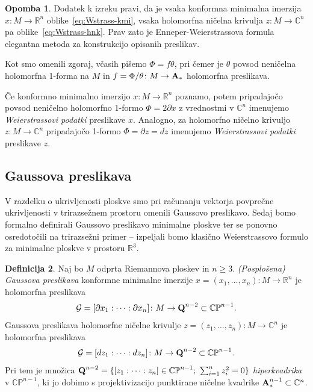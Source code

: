 \documentclass[12pt,a4paper,twoside]{article}
\theoremstyle{definition} %
\newtheorem{definicija}{Definicija}[section]
\newtheorem{opomba}[definicija]{Opomba}
\theoremstyle{plain} %
\numberwithin{equation}{section}  %
\newcommand{\R}{\mathbb R}
\newcommand{\C}{\mathbb C}
\begin{document}
\begin{opomba}
Dodatek k izreku pravi, da je vsaka konformna minimalna imerzija $x \colon M \to \R^{n}$ oblike~\eqref{eq:Wstrass-kmi}, vsaka holomorfna ničelna krivulja $z \colon M \to \C^{n}$ pa oblike~\eqref{eq:Wstrass-hnk}. Prav zato je Enneper-Weierstrassova formula elegantna metoda za konstrukcijo opisanih preslikav.

Kot smo omenili zgoraj, včasih pišemo $\Phi = f \theta$, pri čemer je $\theta$ povsod neničelna holomorfna 1-forma na $M$ in $f = \Phi / \theta \colon M \to \textbf{\textup{A}}_{*}$ holomorfna preslikava.
\end{opomba}

Če konformno minimalno imerzijo $x \colon M \to \R^{n}$ poznamo, potem pripadajočo povsod neničelno holomorfno 1-formo $\Phi = 2 \partial{x}$ z vrednostmi v $\C^{n}$ imenujemo \emph{Weierstrassovi podatki} preslikave $x$. 
Analogno, za holomorfno ničelno krivuljo $z \colon M \to \C^{n}$ pripadajočo 1-formo $\Phi = \partial{z} = dz$ imenujemo \emph{Weierstrassovi podatki} preslikave $z$.

\subsection{Gaussova preslikava}
%
V razdelku o ukrivljenosti ploskve smo pri računanju vektorja povprečne ukrivljenosti v trirazsežnem prostoru omenili Gaussovo preslikavo. Sedaj bomo formalno definirali Gaussovo preslikavo minimalne ploskve ter se ponovno osredotočili na trirazsežni primer -- izpeljali bomo klasično Weierstrassovo formulo za minimalne ploskve v prostoru $\mathbb{R}^3$.

\begin{definicija}
Naj bo $M$ odprta Riemannova ploskev in $n \geq 3$. \emph{(Posplošena) Gaussova preslikava} konformne minimalne imerzije $x = (x_{1}, \dots , x_{n}) \colon M \to \mathbb{R}^{n}$ je holomorfna preslikava
\begin{gather}
\mathcal{G} = [\partial x_{1} : \cdots : \partial x_{n}] \colon M \to \textup{\textbf{Q}}^{n-2} \subset \mathbb{CP}^{n-1}.
\end{gather}
Gaussova preslikava holomorfne ničelne krivulje $z = (z_{1}, \dots , z_{n}) \colon M \to \mathbb{C}^{n}$ je holomorfna preslikava
\begin{gather*}
\mathcal{G} = [dz_{1} : \cdots : dz_{n}] \colon M \to \textup{\textbf{Q}}^{n-2} \subset \mathbb{CP}^{n-1}.
\end{gather*}
Pri tem je množica $\textup{\textbf{Q}}^{n-2} = \{ [z_{1} : \cdots : z_{n}] \in \mathbb{CP}^{n-1} ; \ \sum_{i=1}^{n}z_{i}^2 = 0 \}$ \emph{hiperkvadrika} v $\mathbb{CP}^{n-1}$, ki jo dobimo s projektivizacijo punktirane ničelne kvadrike $\textup{\textbf{A}}_{*}^{n-1} \subset \mathbb{C}^{n}$.
\end{definicija}
\end{document}
